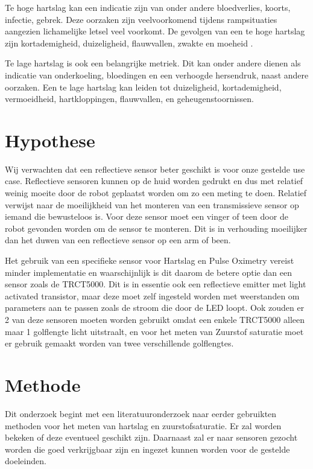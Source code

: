 \documentclass[11pt]{article}
\begin{document}
    Te hoge hartslag kan een indicatie zijn van onder andere bloedverlies, koorts, infectie, gebrek. 
    Deze oorzaken zijn veelvoorkomend tijdens rampsituaties aangezien lichamelijke letsel veel voorkomt. 
    De gevolgen van een te hoge hartslag zijn kortademigheid, duizeligheid, flauwvallen, zwakte en moeheid \citep{low2012postural}.

    Te lage hartslag is ook een belangrijke metriek. 
    Dit kan onder andere dienen als indicatie van onderkoeling, bloedingen en een verhoogde hersendruk, naast andere oorzaken. 
    Een te lage hartslag kan leiden tot duizeligheid, kortademigheid, vermoeidheid, hartkloppingen, flauwvallen, en geheugenstoornissen.\citep{bradycardie} 

	\section{Hypothese}\label{sec:hypothese}

Wij verwachten dat een reflectieve sensor beter geschikt is voor onze gestelde use case. Reflectieve sensoren kunnen op de huid worden gedrukt en dus met relatief weinig  moeite door de robot geplaatst worden om zo een meting te doen. Relatief verwijst naar de moeilijkheid van het  monteren van een transmissieve sensor op iemand die bewusteloos is. Voor deze sensor moet een vinger of teen door de robot gevonden worden om de sensor te monteren. Dit is in verhouding moeilijker dan het duwen van een reflectieve sensor op een arm of been. 

Het gebruik van een specifieke sensor voor Hartslag en Pulse Oximetry vereist minder implementatie en waarschijnlijk is dit daarom de betere optie dan een sensor zoals de TRCT5000. Dit is in essentie ook een reflectieve emitter met light activated transistor, maar deze moet zelf ingesteld worden met weerstanden om parameters aan te passen zoals de stroom die door de LED loopt. Ook zouden er 2 van deze sensoren moeten worden gebruikt omdat een enkele TRCT5000 alleen maar 1 golflengte licht uitstraalt, en voor het meten van Zuurstof saturatie moet er gebruik gemaakt worden van twee verschillende golflengtes.



\section{Methode}\label{sec:methode}
Dit onderzoek begint met een literatuuronderzoek naar eerder gebruikten methoden voor het meten van hartslag en zuurstofsaturatie. Er zal worden bekeken of deze eventueel geschikt zijn. Daarnaast zal er naar sensoren gezocht worden die goed verkrijgbaar zijn en ingezet kunnen worden voor de gestelde doeleinden.
\end{document}
